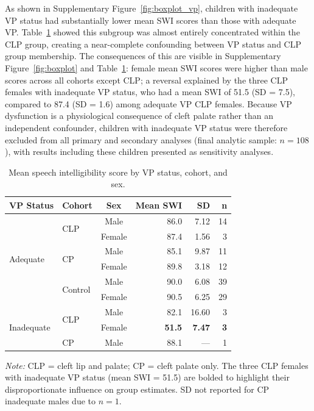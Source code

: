 \documentclass[11pt]{article}
\begin{document}
As shown in Supplementary Figure~\ref{fig:boxplot_vp}, children with
inadequate VP status had substantially lower mean SWI scores than those with
adequate VP. Table~\ref{tab:vp-descriptive} showed this subgroup was
almost entirely concentrated within the CLP group, creating a near-complete
confounding between VP status and CLP group membership. The consequences of
this are visible in Supplementary Figure~\ref{fig:boxplot} and Table~\ref{tab:vp-descriptive}: female mean SWI
scores were higher than male scores across all cohorts except CLP; a reversal explained by the three CLP females with inadequate VP
status, who had a mean SWI of 51.5 (SD = 7.5), compared to 87.4 (SD = 1.6)
among adequate VP CLP females. Because VP dysfunction is a physiological
consequence of cleft palate rather than an independent confounder, children
with inadequate VP status were therefore excluded from all primary and
secondary analyses (final analytic sample: $n = 108$), with results including
these children presented as sensitivity analyses.

\begin{table}[H]
\centering
\caption{Mean speech intelligibility score by VP status, cohort, and sex.}
\label{tab:vp-descriptive}
\begin{threeparttable}
\begin{tabular}{llcrrr}
\toprule
\textbf{VP Status} & \textbf{Cohort} & \textbf{Sex} & \textbf{Mean SWI} & \textbf{SD} & \textbf{n} \\
\midrule
\multirow{6}{*}{Adequate}
  & \multirow{2}{*}{CLP}     & Male   & 86.0 & 7.12  & 14 \\[0.3em]
  &                          & Female & 87.4 & 1.56  &  3 \\[0.6em]
  & \multirow{2}{*}{CP}      & Male   & 85.1 & 9.87  & 11 \\[0.3em]
  &                          & Female & 89.8 & 3.18  & 12 \\[0.6em]
  & \multirow{2}{*}{Control} & Male   & 90.0 & 6.08  & 39 \\[0.3em]
  &                          & Female & 90.5 & 6.25  & 29 \\
\midrule
\multirow{3}{*}{Inadequate}
  & \multirow{2}{*}{CLP}     & Male   & 82.1 & 16.60 &  3 \\[0.3em]
  &                          & Female & \textbf{51.5} & \textbf{7.47} & \textbf{3} \\[0.6em]
  & CP                       & Male   & 88.1 & ---   &  1 \\
\bottomrule
\end{tabular}
\begin{tablenotes}
\small
\item \textit{Note:} CLP = cleft lip and palate; CP = cleft palate only.
The three CLP females with inadequate VP status (mean SWI = 51.5) are bolded
to highlight their disproportionate influence on group estimates. SD not
reported for CP inadequate males due to $n = 1$.
\end{tablenotes}
\end{threeparttable}
\end{table}
\end{document}
